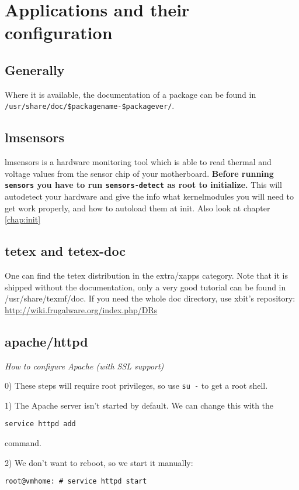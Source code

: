 \chapter{Applications and their configuration}

\section{Generally}
Where it is available, the documentation of a package can be found in {\tt /usr/share/doc/\$packagename-\$packagever/}. 

\section{lmsensors}

lmsensors is a hardware monitoring tool which is able to read thermal and voltage values from the sensor chip of your motherboard.
\textbf{Before running {\tt sensors} you have to run {\tt sensors-detect} as root to initialize.} This will autodetect your hardware and give the info what kernelmodules you will need to get work properly, and how to autoload them at init. Also look at chapter \ref{chap:init}

\section{tetex and tetex-doc}

One can find the tetex distribution in the extra/xapps category. Note that it is shipped without the documentation, only a very good tutorial can be found in /usr/share/texmf/doc.
If you need the whole doc directory, use xbit's repository:
\url{http://wiki.frugalware.org/index.php/DRs}

\section{apache/httpd}

\textit{How to configure Apache (with SSL support)}

0) These steps will require root privileges, so use {\tt su -} to get a root shell.

1) The Apache server isn't started by default. We can change this with the

{\tt service httpd add}

command.

2) We don't want to reboot, so we start it manually:

{\tt root@vmhome:~# service httpd start}

